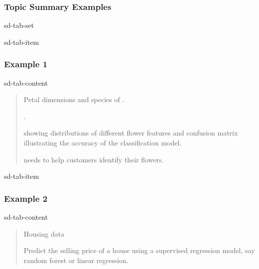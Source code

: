 \documentclass[letterpaper,10pt,english]{jupyterBook}
\begin{document}
\subsubsection{Topic Summary Examples}
\label{\detokenize{task1:topic-summary-examples}}
\begin{sphinxuseclass}{sd-tab-set}
\begin{sphinxuseclass}{sd-tab-item}\subsubsection*{Example 1}

\begin{sphinxuseclass}{sd-tab-content}\begin{quote}

\sphinxAtStartPar
{} Petal dimensions and species of .

\sphinxAtStartPar
{} {\hyperref[\detokenize{task2_c/example_sup_class/sup_class_ex:sup-class-ex}]{}}.

\sphinxAtStartPar
{}  showing distributions of different flower features and confusion matrix illustrating the accuracy of the classification model.

\sphinxAtStartPar
{}  needs to help customers identify their flowers.
\end{quote}

\end{sphinxuseclass}
\end{sphinxuseclass}
\begin{sphinxuseclass}{sd-tab-item}\subsubsection*{Example 2}

\begin{sphinxuseclass}{sd-tab-content}\begin{quote}

\sphinxAtStartPar
{} Housing data

\sphinxAtStartPar
{} Predict the selling price of a house using a supervised regression model, say random forest or linear regression.


\end{quote}
\end{sphinxuseclass}
\end{sphinxuseclass}
\end{sphinxuseclass}
\end{document}
